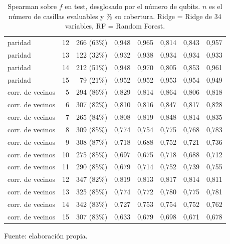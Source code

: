 \begin{table}[htbp]
{\begin{tabular}{@{}lrrrrrrr@{}}
        paridad & 12 & 266 (63\%) & 0,948 & 0,965 & 0,814 & 0,843 & 0,957 \\
        paridad & 13 & 122 (32\%) & 0,932 & 0,938 & 0,934 & 0,934 & 0,933 \\
        paridad & 14 & 212 (51\%) & 0,948 & 0,970 & 0,805 & 0,853 & 0,961 \\
        paridad & 15 & 79 (21\%) & 0,952 & 0,952 & 0,953 & 0,954 & 0,949 \\
        corr. de vecinos & 5 & 294 (86\%) & 0,829 & 0,814 & 0,864 & 0,806 & 0,818 \\
        corr. de vecinos & 6 & 307 (82\%) & 0,810 & 0,816 & 0,847 & 0,817 & 0,828 \\
        corr. de vecinos & 7 & 265 (84\%) & 0,808 & 0,819 & 0,848 & 0,814 & 0,835 \\
        corr. de vecinos & 8 & 309 (85\%) & 0,774 & 0,754 & 0,775 & 0,768 & 0,783 \\
        corr. de vecinos & 9 & 308 (87\%) & 0,718 & 0,688 & 0,752 & 0,721 & 0,736 \\
        corr. de vecinos & 10 & 275 (85\%) & 0,697 & 0,675 & 0,718 & 0,688 & 0,712 \\
        corr. de vecinos & 11 & 290 (85\%) & 0,679 & 0,714 & 0,752 & 0,739 & 0,755 \\
        corr. de vecinos & 12 & 347 (82\%) & 0,819 & 0,813 & 0,817 & 0,814 & 0,811 \\
        corr. de vecinos & 13 & 325 (85\%) & 0,774 & 0,772 & 0,780 & 0,775 & 0,781 \\
        corr. de vecinos & 14 & 342 (83\%) & 0,727 & 0,753 & 0,754 & 0,752 & 0,762 \\
        corr. de vecinos & 15 & 307 (83\%) & 0,633 & 0,679 & 0,698 & 0,671 & 0,678 \\
        \bottomrule
    \end{tabular}}

    \caption{Spearman sobre $f$ en test, desglosado por el número de qubits. $n$ es el número de casillas evaluables y \% su cobertura. Ridge = Ridge de 34 variables, RF = Random Forest.}
    \label{tab:v3_tamano_spearman}

    {\footnotesize Fuente: elaboración propia.}
\end{table}
